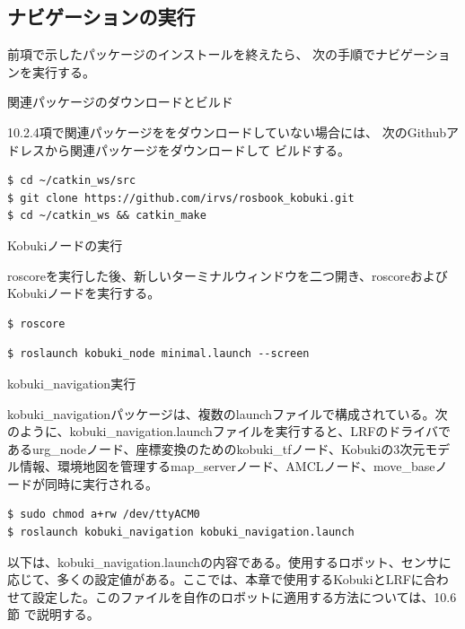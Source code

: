 \subsection{ナビゲーションの実行}

前項で示したパッケージのインストールを終えたら、  次の手順でナビゲーションを実行する。

\setcounter{num}{0}

\circled{\thenum} 関連パッケージのダウンロードとビルド

10.2.4項で関連パッケージををダウンロードしていない場合には、  次のGithubアドレスから関連パッケージをダウンロードして  ビルドする。

\begin{lstlisting}[language=ROS]
$ cd ~/catkin_ws/src
$ git clone https://github.com/irvs/rosbook_kobuki.git
$ cd ~/catkin_ws && catkin_make
\end{lstlisting}

\circled{\thenum} Kobukiノードの実行

roscoreを実行した後、新しいターミナルウィンドウを二つ開き、roscoreおよびKobukiノードを実行する。

\begin{lstlisting}[language=ROS]
$ roscore
\end{lstlisting}

\begin{lstlisting}[language=ROS]
$ roslaunch kobuki_node minimal.launch --screen
\end{lstlisting}

\circled{\thenum} kobuki\_navigation実行

kobuki\_navigationパッケージは、複数のlaunchファイルで構成されている。次のように、kobuki\_navigation.launchファイルを実行すると、LRFのドライバであるurg\_nodeノード、座標変換のためのkobuki\_tfノード、Kobukiの3次元モデル情報、環境地図を管理するmap\_serverノード、AMCLノード、move\_baseノードが同時に実行される。

\begin{lstlisting}[language=ROS]
$ sudo chmod a+rw /dev/ttyACM0
$ roslaunch kobuki_navigation kobuki_navigation.launch
\end{lstlisting}

以下は、kobuki\_navigation.launchの内容である。使用するロボット、センサに応じて、多くの設定値がある。ここでは、本章で使用するKobukiとLRFに合わせて設定した。このファイルを自作のロボットに適用する方法については、10.6節 で説明する。

